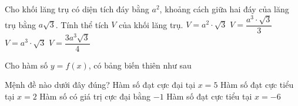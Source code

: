 \begin{ex}%
	Cho khối lăng trụ có diện tích đáy bằng $a^2$, khoảng cách giữa hai đáy của lăng trụ bằng $a\sqrt{3}$. Tính thể tích $V$ của khối lăng trụ.
	\choice
	{\True $V=a^2\cdot \sqrt{3}$}
	{$V=\dfrac{a^3\cdot \sqrt{3}}{3}$}
	{$V=a^3\cdot \sqrt{3}$}
	{$V=\dfrac{3a^3\sqrt{3}}{4}$}
\end{ex}

\begin{ex}%
	Cho hàm số $y=f(x)$, có bảng biến thiên như sau
\begin{center}
\end{center}
	Mệnh đề nào dưới đây đúng?
	\choice
	{Hàm số đạt cực đại tại $x=5$}
	{\True Hàm số đạt cực tiểu tại $x=2$}
	{Hàm số có giá trị cực đại bằng $-1$}
	{Hàm số đạt cực tiểu tại $x=-6$}
\end{ex}

